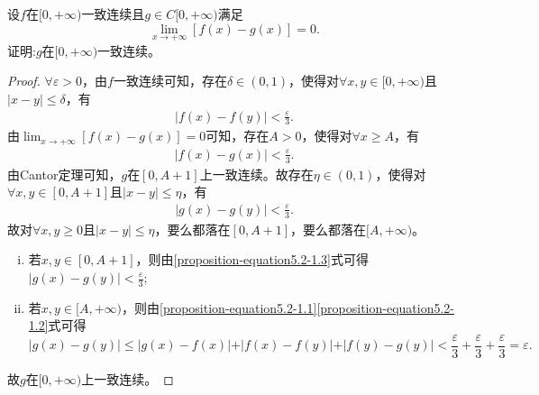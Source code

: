 \documentclass[../../main.tex]{subfiles}%
\begin{document}
\begin{proposition}\label{proposition:连续函数在无穷远处与一致连续极限相同则一定也一致连续}
设\(f\)在\([0,+\infty)\)一致连续且\(g\in C[0,+\infty)\)满足
\[
\lim_{x\rightarrow +\infty}[f(x)-g(x)] = 0.
\]
证明:\(g\)在\([0,+\infty)\)一致连续。
\end{proposition}
\begin{proof}
\(\forall \varepsilon > 0\)，由\(f\)一致连续可知，存在\(\delta \in (0, 1)\)，使得对\(\forall x, y \in [0, +\infty)\)且\(\vert x - y \vert \leqslant  \delta\)，有
\begin{align}\label{proposition-equation5.2-1.1}
\vert f(x) - f(y) \vert < \frac{\varepsilon}{3}. 
\end{align}
由\(\lim_{x \to +\infty}[f(x) - g(x)] = 0\)可知，存在\(A > 0\)，使得对\(\forall x \geqslant  A\)，有
\begin{align}\label{proposition-equation5.2-1.2}
\vert f(x) - g(x) \vert < \frac{\varepsilon}{3}.  
\end{align}
由Cantor定理可知，\(g\)在\([0, A + 1]\)上一致连续。故存在\(\eta \in (0, 1)\)，使得对\(\forall x, y \in [0, A + 1]\)且\(\vert x - y \vert \leqslant  \eta\)，有
\begin{align}\label{proposition-equation5.2-1.3}
\vert g(x) - g(y) \vert < \frac{\varepsilon}{3}. 
\end{align}
故对\(\forall x, y \geqslant  0\)且\(\vert x - y \vert \leqslant  \eta\)，要么都落在\([0, A + 1]\)，要么都落在\([A, +\infty)\)。
\begin{enumerate}[(i)]
\item 若\(x, y \in [0, A + 1]\)，则由\eqref{proposition-equation5.2-1.3}式可得\(\vert g(x) - g(y) \vert < \frac{\varepsilon}{3}\);
\item 若\(x, y \in [A, +\infty)\)，则由\eqref{proposition-equation5.2-1.1}\eqref{proposition-equation5.2-1.2}式可得
\[
\vert g(x) - g(y) \vert \leqslant  \vert g(x) - f(x) \vert + \vert f(x) - f(y) \vert + \vert f(y) - g(y) \vert < \frac{\varepsilon}{3} + \frac{\varepsilon}{3} + \frac{\varepsilon}{3} = \varepsilon.
\]
\end{enumerate}
故\(g\)在\([0, +\infty)\)上一致连续。
\end{proof}
\end{document}
